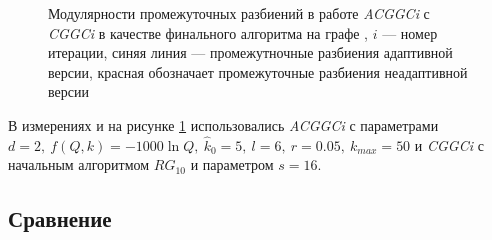 \begin{figure}[H]
	\caption{Модулярности промежуточных разбиений в работе \emph{ACGGCi} с \emph{CGGCi} в качестве финального алгоритма на графе \emph{\celegans}, $i$ --- номер итерации, синяя линия --- промежутночные разбиения адаптивной версии, красная обозначает промежуточные разбиения неадаптивной версии}
	\label{fig:es-final}
\end{figure}

В измерениях и на рисунке \ref{fig:es-final} использовались \emph{ACGGCi} с параметрами $d = 2,\ f(Q, k) = -1000 \ln Q,\ \hat{k}_0 = 5,\ l = 6,\ r = 0.05,\ k_{max} = 50$ и \emph{CGGCi} с начальным алгоритмом $RG_{10}$ и параметром $s = 16$.



\subsection{Сравнение}

